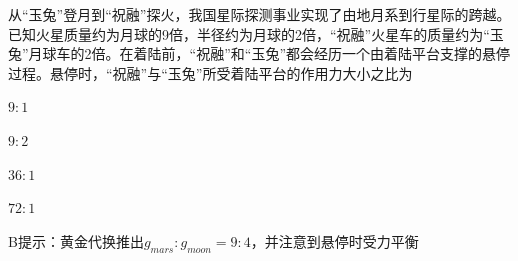 从“玉兔”登月到“祝融”探火，我国星际探测事业实现了由地月系到行星际的跨越。已知火星质量约为月球的9倍，半径约为月球的2倍，“祝融”火星车的质量约为“玉兔”月球车的2倍。在着陆前，“祝融”和“玉兔”都会经历一个由着陆平台支撑的悬停过程。悬停时，“祝融”与“玉兔”所受着陆平台的作用力大小之比为\paren[]
\begin{choices}
	\item \(9:1\)
	\item \(9:2\)
	\item \(36:1\)
	\item \(72:1\)
\end{choices}
\begin{answer}
	B\qquad 提示：黄金代换推出\(g_{mars}:g_{moon} = 9:4\)，并注意到悬停时受力平衡
\end{answer}
